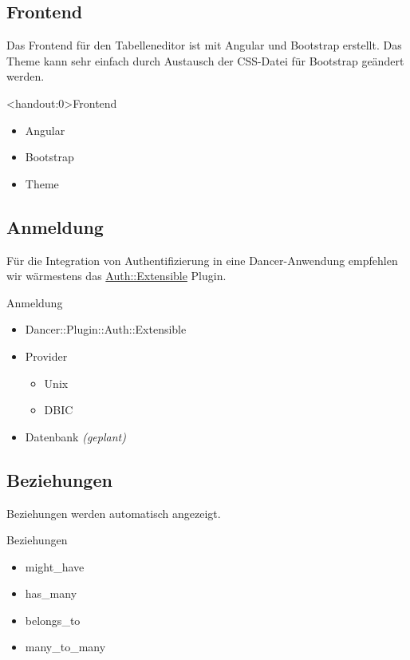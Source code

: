 \subsection{Frontend}
Das Frontend für den Tabelleneditor ist mit Angular und Bootstrap erstellt.
Das Theme kann sehr einfach durch Austausch der CSS-Datei für Bootstrap
geändert werden.

\begin{frame}<handout:0>{Frontend}
\begin{itemize}
\item Angular
\item Bootstrap
\item Theme
\end{itemize}
\end{frame}

\subsection{Anmeldung}

Für die Integration von Authentifizierung in eine Dancer-Anwendung empfehlen
wir wärmestens das
\href{https://metacpan.org/pod/Dancer::Plugin::Auth::Extensible}{Auth::Extensible}
Plugin.

\begin{frame}{Anmeldung}
\begin{itemize}
\item Dancer::Plugin::Auth::Extensible
\item Provider
\begin{itemize}
\item Unix
\item DBIC
\end{itemize}
\item Datenbank \textit{(geplant)}
\end{itemize}
\end{frame}

\subsection{Beziehungen}

Beziehungen werden automatisch angezeigt.

\begin{frame}{Beziehungen}
\begin{itemize}
\item might\_have
\item has\_many
\item belongs\_to
\item many\_to\_many
\end{itemize}
\end{frame}

